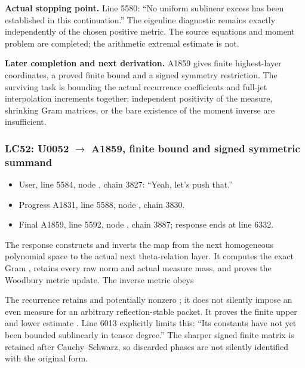 \textbf{Actual stopping point.} Line 5580: ``No uniform sublinear excess
has been established in this continuation.'' The eigenline diagnostic
remains exactly \protect{} independently of the chosen
positive metric. The source equations and moment problem are completed;
the arithmetic extremal estimate is not.

\textbf{Later completion and next derivation.} A1859 gives finite
highest-layer coordinates, a proved finite bound and a signed symmetry
restriction. The surviving task is bounding the actual recurrence
coefficients and full-jet interpolation increments together; independent
positivity of the measure, shrinking Gram matrices, or the bare
existence of the moment inverse are insufficient.

\subsubsection{\texorpdfstring{LC52: U0052
\allowbreak{}\ensuremath{→}\allowbreak{} A1859, finite bound and signed
symmetric
summand}{LC52: U0052  A1859, finite bound and signed symmetric summand}}\label{TranscriptLedgerStage:lc52-u0052-a1859-finite-bound-and-signed-symmetric-summand}

\begin{itemize}
\tightlist
\item
  User, line 5584, node
  \protect{}, chain 3827:
  ``Yeah, let's push that.''
\item
  Progress A1831, line 5588, node
  \protect{}, chain 3830.
\item
  Final A1859, line 5592, node
  \protect{}, chain 3887;
  response ends at line 6332.
\end{itemize}

The response constructs and inverts the map \protect{}
from the next homogeneous polynomial space to the actual next
theta-relation layer. It computes the exact Gram
\protect{}, retains every raw norm and actual measure
mass, and proves the Woodbury metric update. The inverse metric obeys


The recurrence retains \protect{} and potentially nonzero
\protect{}; it does not silently impose an even measure for
an arbitrary reflection-stable packet. It proves the finite upper and
lower estimate
\protect{}. Line
6013 explicitly limits this: ``Its constants have not yet been bounded
sublinearly in tensor degree.'' The sharper signed finite matrix is
retained after Cauchy--Schwarz, so discarded phases are not silently
identified with the original form.

